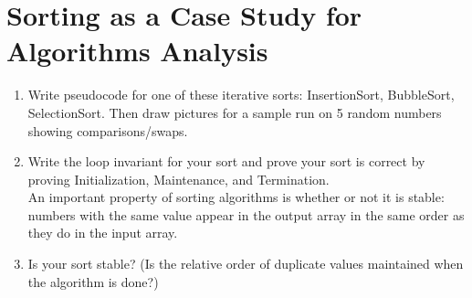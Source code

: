 \documentclass[12pt]{report}
\begin{document}
\section{Sorting as a Case Study for Algorithms Analysis}\label{sec:sorting-as-a-case-study-for-algorithms-analysis}
\begin{enumerate}[label=\arabic*.]
    \item Write pseudocode for one of these iterative sorts: InsertionSort, BubbleSort, SelectionSort. Then draw pictures for a sample run on 5 random numbers showing comparisons/swaps.

	\item Write the loop invariant for your sort and prove your sort is correct by proving Initialization, Maintenance, and Termination.\\

	An important property of sorting algorithms is whether or not it is stable: numbers with the same value appear in the output array in the same order as they do in the input array. 
	\item Is your sort stable? (Is the relative order of duplicate values maintained when the algorithm is done?) \\


\end{enumerate}
\end{document}
